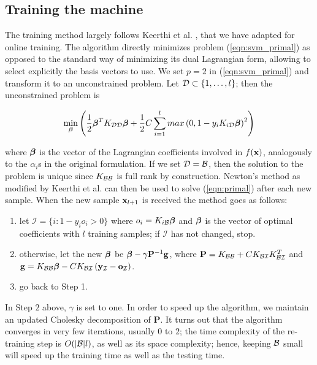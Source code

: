 \subsection{Training the machine}

The training method largely follows Keerthi et
al. \cite{KeerthiDC05,KeerthiCDC06}, that we have adapted for online
training. The algorithm directly minimizes problem
(\ref{eqn:svm_primal}) as opposed to the standard way of minimizing
its dual Lagrangian form, allowing to select explicitly the basis
vectors to use. We set $p=2$ in (\ref{eqn:svm_primal}) and transform
it to an unconstrained problem.  Let $\mathcal{D} \subset \{1,\ldots,l\}$; then
the unconstrained problem is

\begin{equation} \label{eqn:primal}
  \min_{\boldsymbol{\beta}} \left( 
      \frac{1}{2} \boldsymbol{\beta}^T K_{\mathcal{D}\mathcal{D}} \boldsymbol{\beta}
    + \frac{1}{2} C \sum_{i=1}^l max \left(0,1-y_i K_{i\mathcal{D}} \boldsymbol{\beta} \right)^2
  \right)
\end{equation}

\noindent where $\boldsymbol{\beta}$ is the vector of the Lagrangian coefficients involved
in $f(\mathbf{x})$, analogously to the $\alpha_i$s in the original
formulation. If we set $\mathcal{D} = \mathcal{B}$, then the solution to the problem is
unique since $K_{\mathcal{B}\mathcal{B}}$ is full rank by construction. Newton's method
as modified by Keerthi et al. \cite{KeerthiDC05,KeerthiCDC06} can then
be used to solve (\ref{eqn:primal}) after each new sample. When the
new sample $\mathbf{x}_{l+1}$ is received the method goes as follows:

\begin{enumerate}

   \item let $\mathcal{I} = \{ i: 1-y_i o_i>0 \}$ where $o_i =
     K_{i\mathcal{B}} \boldsymbol{\beta}$ and $\boldsymbol{\beta}$ is the vector of optimal coefficients
     with $l$ training samples; if $\mathcal{I}$ has not changed, stop.

   \item otherwise, let the new $\boldsymbol{\beta}$ be $\boldsymbol{\beta} - \gamma
     \mathbf{P}^{-1}\mathbf{g}$, where $\mathbf{P} = K_{\mathcal{B}\mathcal{B}} + C
     K_{\mathcal{B}\mathcal{I}} K_{\mathcal{B}\mathcal{I}}^T$ and $\mathbf{g} = K_{\mathcal{B}\mathcal{B}}
     \boldsymbol{\beta} - C K_{\mathcal{B}\mathcal{I}} \left(
     \mathbf{y}_{\mathcal{I}}-\mathbf{o}_{\mathcal{I}}\right)$.

   \item go back to Step 1.

\end{enumerate}

In Step $2$ above, $\gamma$ is set to one. In order to speed up the
algorithm, we maintain an updated Cholesky decomposition of
$\mathbf{P}$. It turns out that the algorithm converges in very few
iterations, usually $0$ to $2$; the time complexity of the re-training
step is $O(|\mathcal{B}|l)$, as well as its space complexity; hence, keeping
$\mathcal{B}$ small will speed up the training time as well as the testing
time.
